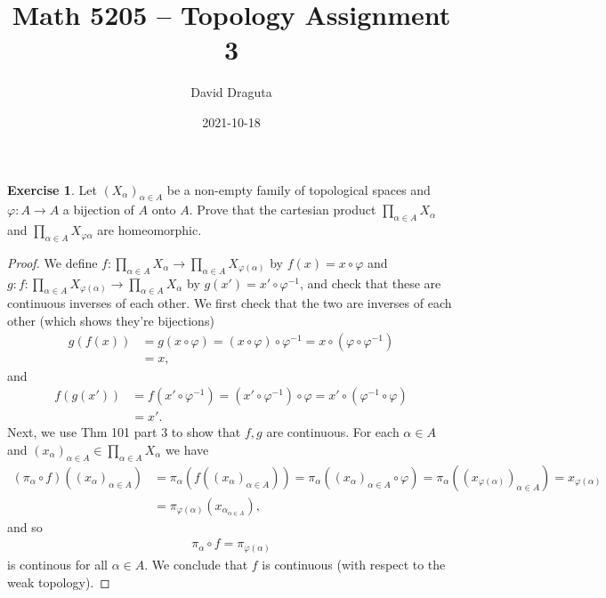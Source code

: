 \documentclass[12pt]{extarticle}
\title{ Math 5205 -- Topology Assignment 3}
\author{David Draguta}
\date{2021-10-18}
\newcommand{\<}{\langle}
\renewcommand{\>}{\rangle}
\theoremstyle{definition}
\newtheorem{exercise}{Exercise}
\begin{document}
\maketitle

\begin{exercise}
  Let $(X_{\alpha})_{\alpha \in A}$ be a non-empty family of topological spaces and $\varphi: A \to A$ a bijection of $A$ onto $A$. Prove that the cartesian product
  $\prod\limits_{\alpha \in A}X_{\alpha}$ and $\prod\limits_{\alpha \in A}X_{\varphi{\alpha}}$ are homeomorphic. 
\end{exercise}
\begin{proof}
  We define $f: \prod\limits_{\alpha \in A}X_{\alpha} \to \prod\limits_{\alpha \in A}X_{\varphi(\alpha)}$ by $ f(x) = x \circ \varphi$ and $g: f: \prod\limits_{\alpha \in A}X_{\varphi(\alpha)} \to \prod\limits_{\alpha \in A}X_{\alpha}$ by $g(x') = x' \circ \varphi^{-1}$, and check that these are continuous inverses of each other. We first check that the two are inverses of each other (which shows they're bijections)
  \begin{align*}
    g(f(x))  &= g(x \circ \varphi)     = (x \circ \varphi) \circ \varphi^{-1} = x \circ (\varphi \circ \varphi^{-1}) \\
    &= x, 
  \end{align*}
  and
  \begin{align*}
    f(g(x')) &= f(x'\circ \varphi^{-1}) = (x' \circ \varphi^{-1}) \circ \varphi = x' \circ (\varphi^{-1} \circ \varphi) \\
    &= x'.
  \end{align*}
  Next, we use Thm 101 part 3 to show that $f,g$ are continuous. For each $\alpha \in A$ and $(x_{\alpha})_{\alpha \in A} \in \prod\limits_{\alpha \in A}X_{\alpha}$ we have 
  \begin{align*}
    (\pi_\alpha \circ f)((x_{\alpha})_{\alpha \in A}) &= \pi_\alpha(f((x_{\alpha})_{\alpha \in A})) = \pi_{\alpha}((x_{\alpha})_{\alpha \in A} \circ \varphi) = \pi_{\alpha}((x_{\varphi(\alpha)})_{\alpha \in A}) = x_{\varphi(\alpha)} \\
    &= \pi_{\varphi(\alpha)}(x_{\alpha}_{\alpha \in A}),
  \end{align*}
  and so
  \begin{align*}
    \pi_{\alpha} \circ f  = \pi_{\varphi(\alpha)}
  \end{align*}
  is continous for all $\alpha \in A$. We conclude that $f$ is continuous (with respect to the weak topology).


\end{proof}
\end{document}
